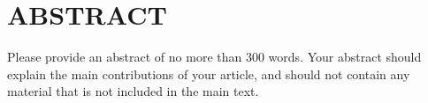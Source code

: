 \documentclass[12pt,titlepage]{article}
\begin{document}




\flushbottom

\thispagestyle{empty}

\section*{ABSTRACT}
Please provide an abstract of no more than 300 words. Your abstract should explain the main contributions of your article, and should not contain any material that is not included in the main text.








\newpage







%


%
\end{document}
